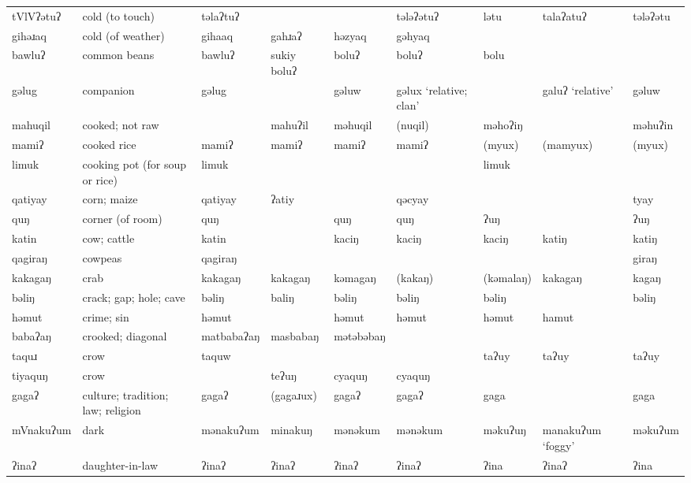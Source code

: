 \begin{landscape}
\begin{longtable}{*{9}{>{\raggedright\arraybackslash}p{}}}
\text{*}tVlVʔətuʔ    & cold (to touch) & təlaʔtuʔ &  &  & tələʔətuʔ & lətu & talaʔatuʔ & tələʔətu\\
\text{*}gihəɹaq      & cold (of weather) & gihaaq & gahɹaʔ & həzyaq & gəhyaq &  &  & \\
\text{*}bawluʔ       & common beans & bawluʔ & sukiy boluʔ & boluʔ & boluʔ & bolu &  & \\
\text{*}gəlug        & companion & gəlug &  & gəluw & gəlux `relative; clan' &  & galuʔ \newline `relative' & gəluw\\
\text{*}mahuqil      & cooked; not raw &  & mahuʔil & məhuqil & (nuqil) & məhoʔiŋ &  & məhuʔin\\
\text{*}mamiʔ        & cooked rice & mamiʔ & mamiʔ & mamiʔ & mamiʔ & (myux) & (mamyux) & (myux)\\
\text{*}limuk        & cooking pot (for soup or rice) & limuk &  &  &  & limuk &  & \\
\text{*}qatiyay      & corn; maize & qatiyay & ʔatiy &  & qəcyay &  &  & tyay\\
\text{*}quŋ          & corner (of room) & quŋ &  & quŋ & quŋ & ʔuŋ &  & ʔuŋ\\
\text{*}katin        & cow; cattle & katin &  & kaciŋ & kaciŋ & kaciŋ & katiŋ & katiŋ\\
\text{*}qagiraŋ      & cowpeas & qagiraŋ &  &  &  &  &  & giraŋ\\
\text{*}kakagaŋ      & crab & kakagaŋ & kakagaŋ & kəmagaŋ & (kakaŋ) & (kəmalaŋ) & kakagaŋ & kagaŋ\\
\text{*}bəliŋ        & crack; gap; hole; cave & bəliŋ & baliŋ & bəliŋ & bəliŋ & bəliŋ &  & bəliŋ\\
\text{*}həmut        & crime; sin & həmut &  & həmut & həmut & həmut & hamut & \\
\text{*}babaʔaŋ     & crooked; diagonal & matbabaʔaŋ & masbabaŋ & mətəbəbaŋ &  &  &  & \\
\text{*}taquɹ        & crow & taquw &  &  &  & taʔuy & taʔuy & taʔuy\\
\text{*}tiyaquŋ      & crow &  & teʔuŋ & cyaquŋ & cyaquŋ &  &  & \\
\text{*}gagaʔ        & culture; tradition; law; religion & gagaʔ & (gagaɹux) & gagaʔ & gagaʔ & gaga &  & gaga\\
\text{*}mVnakuʔum    & dark & mənakuʔum & minakuŋ & mənəkum & mənəkum & məkuʔuŋ & manakuʔum `foggy' & məkuʔum\\
\text{*}ʔinaʔ        & daughter-in-law & ʔinaʔ & ʔinaʔ & ʔinaʔ & ʔinaʔ & ʔina & ʔinaʔ & ʔina\\

\end{longtable}
\end{landscape}

